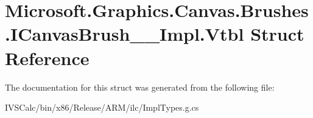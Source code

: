 \hypertarget{struct_microsoft_1_1_graphics_1_1_canvas_1_1_brushes_1_1_i_canvas_brush_____impl_1_1_vtbl}{}\section{Microsoft.\+Graphics.\+Canvas.\+Brushes.\+I\+Canvas\+Brush\+\_\+\+\_\+\+Impl.\+Vtbl Struct Reference}
\label{struct_microsoft_1_1_graphics_1_1_canvas_1_1_brushes_1_1_i_canvas_brush_____impl_1_1_vtbl}


The documentation for this struct was generated from the following file\+:\begin{DoxyCompactItemize}
\item 
I\+V\+S\+Calc/bin/x86/\+Release/\+A\+R\+M/ilc/Impl\+Types.\+g.\+cs\end{DoxyCompactItemize}
